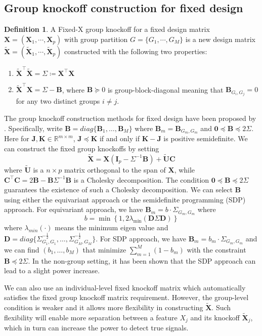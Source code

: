 \documentclass[11pt]{article}
\theoremstyle{plain}
\theoremstyle{definition}
\newtheorem{definition}[theorem]{Definition}
\theoremstyle{remark}
\def\R{\mathbb{R}}
\def\R{\mathbb{R}}
\newcommand{\ident}{\mathbf{I}}
\newcommand{\X}{\mathbf{X}}
\newcommand{\B}{\mathbf{B}}
\newcommand{\U}{\mathbf{U}}
\newcommand{\C}{\mathbf{C}}
\newcommand{\D}{\mathbf{D}}
\newcommand{\0}{\mathbf{0}}
\newcommand{\K}{\mathbf{K}}
\newcommand{\J}{\mathbf{J}}
\begin{document}
\subsection{Group knockoff construction for fixed design}
\begin{definition} 
A Fixed-X group knockoff for a fixed design matrix $\X=(\X_1,\cdots,\X_p)$ with group partition $G=\{G_1,\cdots,G_M\}$ is a new design matrix $\widetilde{\X}=(\widetilde{\X}_1,\cdots,\widetilde{\X}_p)$ constructed with the following two properties:
\begin{enumerate}
\item $\widetilde{\X}^\top \widetilde{\X} = \Sigma\coloneqq \X^\top \X$
\item $\widetilde{\X}^\top \X = \Sigma - \B$, where $\B\succeq 0$ is group-block-diagonal meaning that $\B_{G_i,G_j} = 0$ for any two distinct groups $i\neq j$. 
\end{enumerate}
\end{definition}
The group knockoff construction methods for fixed design have been proposed by \cite{dai2016}. Specifically, write $\B = diag\{\B_1,\dots,\B_M\}$ where $\B_m=\B_{G_m,G_m}$ and $\0\preceq \B \preceq 2\Sigma$. Here for $\J, \K \in \R^{m\times m}$, $\J \preceq \K$ if and only if $\K -\J$ is positive semidefinite. We can construct the fixed group knockoffs by setting \[\widetilde{\X} = \X(\ident_p -\Sigma^{-1}\B)+\widetilde{\U}\C\]
where $\widetilde{\U}$ is a $n\times p$ matrix orthogonal to the span of $\X$, while $\C^\top \C = 2\B - \B \Sigma^{-1}\B$ is a Cholesky decomposition. The condition $\0\preceq\B\preceq 2\Sigma$ guarantees the existence of such a Cholesky decomposition. We can select $\B$ using either the equivariant approach or the semidefinite programming (SDP) approach. For equivariant approach, we have $\B_m = b \cdot \Sigma_{G_m,G_m}$ where \[b = \min\left\{1, 2\lambda_{\min}\left(\D\Sigma \D\right)\right\}\] where $\lambda_{min}(\cdot)$ means the minimum eigen value and $\D = diag\{\Sigma_{G_1,G_1}^{-\frac{1}{2}},\dots,\Sigma_{G_M,G_M}^{-\frac{1}{2}}\}$. For SDP approach, we have $\B_m = b_m \cdot \Sigma_{G_m,G_m}$ and we can find $(b_1,\dots,b_M)$ that minimize $\sum_{m=1}^M (1-b_m)$ with the constraint $\B\preceq 2\Sigma$. In the non-group setting, it has been shown that the SDP approach can lead to a slight power increase.

We can also use an individual-level fixed knockoff matrix which automatically satisfies the fixed group knockoff matrix requirement. However, the group-level condition is weaker and it allows more flexibility in constructing $\widetilde{\X}$. Such flexibility will enable more separation between a feature $X_j$ and its knockoff $\widetilde{\X}_j$, which in turn can increase the power to detect true signals.
\end{document}
